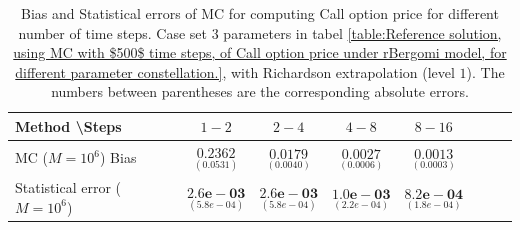 \documentclass[11pt]{article}
\begin{document}
\begin{table}[h!]
\centering
\begin{tabular}{l*{6}{c}r}
Method \textbackslash  Steps            & $1-2$ & $2-4$ & $4-8$ & $8-16$  \\
\hline
MC ($M=10^6$)  Bias   &$\underset{(    0.0531)}{\mathbf{0.2362}}$  & $\underset{( 0.0040)}{\mathbf{0.0179}}$  & $\underset{(  0.0006)}{\mathbf{0.0027}}$  & $\underset{(0.0003 )}{\mathbf{0.0013}}$ \\	

Statistical error ($M=10^6$)    & $\underset{( 5.8e-04)}{\mathbf{2.6e-03}}$  &  $\underset{( 5.8e-04)}{\mathbf{2.6e-03}}$ & $\underset{( 2.2e-04)}{\mathbf{1.0e-03}}$ & $\underset{(1.8e-04 )}{\mathbf{ 8.2e-04}}$ \\

\hline
\end{tabular}
\caption{Bias and Statistical errors of MC  for computing Call option price  for different number of time steps. Case set $3$ parameters in tabel \ref{table:Reference solution, using MC with $500$ time steps, of Call option price under rBergomi model, for different parameter constellation.}, with Richardson extrapolation (level $1$). The numbers between parentheses are the corresponding absolute errors.}
\label{Bias and Statistical errors of MC ($M=10^6$)  for computing Call option price  for different number of time steps. Case set $3$ parameters, with Richardson extrapolation (level1). The numbers between parentheses are the corresponding absolute errors.}
\end{table}
\end{document}
